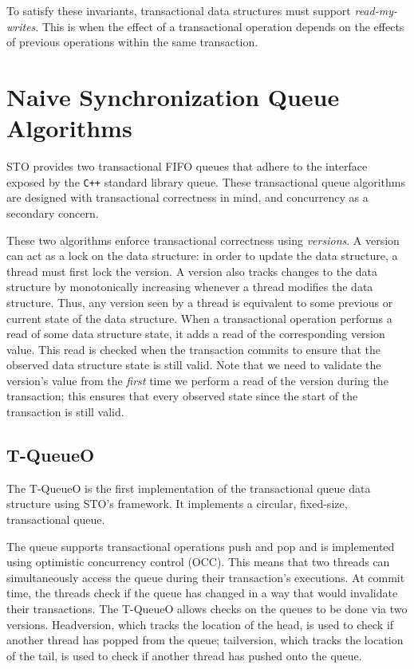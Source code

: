 \noindent
To satisfy these invariants, transactional data structures must support \emph{read-my-writes}. This is when the effect of a transactional operation depends on the effects of previous operations within the same transaction.

\section{Naive Synchronization Queue Algorithms}

STO provides two transactional FIFO queues that adhere to the interface exposed by the \texttt{C++} standard library queue. These transactional queue algorithms are designed with transactional correctness in mind, and concurrency as a secondary concern. 

These two algorithms enforce transactional correctness using \emph{versions}. A version can act as a lock on the data structure: in order to update the data structure, a thread must first lock the version. A version also tracks changes to the data structure by monotonically increasing whenever a thread modifies the data structure. Thus, any version seen by a thread is equivalent to some previous or current state of the data structure. When a transactional operation performs a read of some data structure state, it adds a read of the corresponding version value. This read is checked when the transaction commits to ensure that the observed data structure state is still valid.
Note that we need to validate the version's value from the \emph{first} time we perform a read of the version during the transaction; this ensures that every observed state since the start of the transaction is still valid.

\subsection{T-QueueO}
The T-QueueO is the first implementation of the transactional queue data structure using STO's framework. It implements a circular, fixed-size, transactional queue.

The queue supports transactional operations push and pop and is implemented using optimistic concurrency control (OCC). This means that two threads can simultaneously access the queue during their transaction's executions. At commit time, the threads check if the queue has changed in a way that would invalidate their transactions. The T-QueueO allows checks on the queues to be done via two versions. Headversion, which tracks the location of the head, is used to check if another thread has popped from the queue; tailversion, which tracks the location of the tail, is used to check if another thread has pushed onto the queue.

